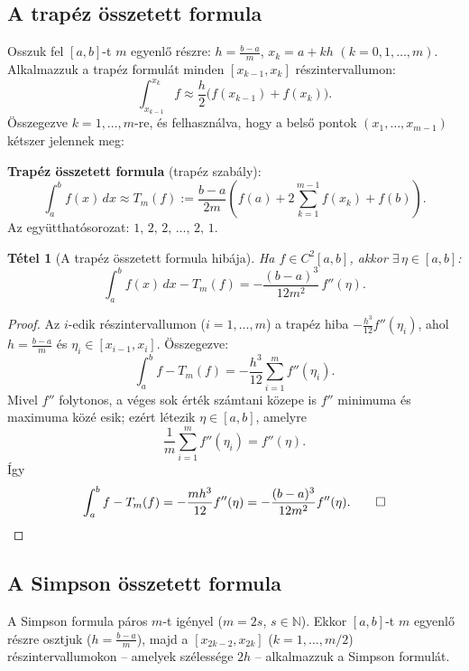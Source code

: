 \documentclass[a4paper,12pt]{article}
\theoremstyle{mydef}
\newtheorem{tetel}{Tétel}[section]
\newcommand{\N}{\mathbb{N}}
\begin{document}
\subsection*{A trapéz összetett formula}

Osszuk fel $[a,b]$-t $m$ egyenlő részre: $h = \tfrac{b-a}{m}$,
$x_k = a + kh$ $(k = 0, 1, \ldots, m)$.
Alkalmazzuk a trapéz formulát minden $[x_{k-1}, x_k]$ részintervallumon:
\[
  \int_{x_{k-1}}^{x_k} f \approx \frac{h}{2}\bigl(f(x_{k-1}) + f(x_k)\bigr).
\]
Összegezve $k = 1, \ldots, m$-re, és felhasználva, hogy a belső pontok $(x_1, \ldots, x_{m-1})$
kétszer jelennek meg:

\begin{mdframed}[backgroundcolor=thmbg,linewidth=0pt,innertopmargin=8pt,innerbottommargin=8pt]
\textbf{Trapéz összetett formula} (trapéz szabály):
\[
  \int_a^b f(x)\,dx \approx T_m(f) := \frac{b-a}{2m}
  \left(f(a) + 2\sum_{k=1}^{m-1} f(x_k) + f(b)\right).
\]
Az együtthatósorozat: $1,\,2,\,2,\,\ldots,\,2,\,1$.
\end{mdframed}

\begin{mdframed}[backgroundcolor=thmbg,linewidth=0pt,innertopmargin=8pt,innerbottommargin=8pt]
\begin{tetel}[A trapéz összetett formula hibája]
\label{tetel:trapezosszetett}
Ha $f \in C^2[a,b]$, akkor $\exists\,\eta \in [a,b]$:
\[
  \int_a^b f(x)\,dx - T_m(f) = -\frac{(b-a)^3}{12m^2}\,f''(\eta).
\]
\end{tetel}
\end{mdframed}

\begin{proof}
Az $i$-edik részintervallumon ($i = 1, \ldots, m$) a trapéz hiba
$-\tfrac{h^3}{12}f''(\eta_i)$, ahol $h = \tfrac{b-a}{m}$ és
$\eta_i\in[x_{i-1},x_i]$. Összegezve:
\[
  \int_a^b f - T_m(f) = -\frac{h^3}{12}\sum_{i=1}^m f''(\eta_i).
\]
Mivel $f''$ folytonos, a véges sok érték számtani közepe is $f''$ minimuma és maximuma
közé esik; ezért létezik $\eta\in[a,b]$, amelyre
\[
  \frac1m\sum_{i=1}^m f''(\eta_i)=f''(\eta).
\]
Így
\[
  \int_a^b f - T_m(f)
  = -\frac{m h^3}{12} f''(\eta)
  = -\frac{(b-a)^3}{12m^2}f''(\eta). \qed
\]
\end{proof}

\subsection*{A Simpson összetett formula}

A Simpson formula páros $m$-t igényel ($m = 2s$, $s \in \N$). Ekkor $[a,b]$-t $m$ egyenlő
részre osztjuk ($h = \tfrac{b-a}{m}$), majd a $[x_{2k-2}, x_{2k}]$ ($k = 1, \ldots, m/2$)
részintervallumokon -- amelyek szélessége $2h$ -- alkalmazzuk a Simpson formulát.
\end{document}
